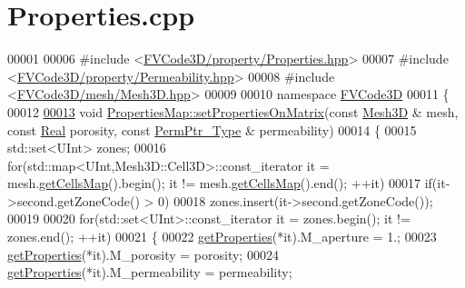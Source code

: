 \hypertarget{Properties_8cpp_source}{}\section{Properties.\+cpp}
\label{Properties_8cpp_source}

\begin{DoxyCode}
00001 
00006 \textcolor{preprocessor}{#include <\hyperlink{Properties_8hpp}{FVCode3D/property/Properties.hpp}>}
00007 \textcolor{preprocessor}{#include <\hyperlink{Permeability_8hpp}{FVCode3D/property/Permeability.hpp}>}
00008 \textcolor{preprocessor}{#include <\hyperlink{Mesh3D_8hpp}{FVCode3D/mesh/Mesh3D.hpp}>}
00009 
00010 \textcolor{keyword}{namespace }\hyperlink{namespaceFVCode3D}{FVCode3D}
00011 \{
00012 
\hypertarget{Properties_8cpp_source.tex_l00013}{}\hyperlink{classFVCode3D_1_1PropertiesMap_ad5f9cccc9355b9af66025f6c433b8997}{00013} \textcolor{keywordtype}{void} \hyperlink{classFVCode3D_1_1PropertiesMap_ad5f9cccc9355b9af66025f6c433b8997}{PropertiesMap::setPropertiesOnMatrix}(\textcolor{keyword}{const} 
      \hyperlink{classFVCode3D_1_1Mesh3D}{Mesh3D} & mesh, \textcolor{keyword}{const} \hyperlink{namespaceFVCode3D_a40c1f5588a248569d80aa5f867080e83}{Real} porosity, \textcolor{keyword}{const} \hyperlink{namespaceFVCode3D_aee5ae48a57366603109f90f526a645b1}{PermPtr\_Type} & permeability)
00014 \{
00015     std::set<UInt> zones;
00016     \textcolor{keywordflow}{for}(std::map<UInt,Mesh3D::Cell3D>::const\_iterator it = mesh.\hyperlink{classFVCode3D_1_1Mesh3D_ad904ef5e068c89951d77e9364e960bf3}{getCellsMap}().begin(); it != 
      mesh.\hyperlink{classFVCode3D_1_1Mesh3D_ad904ef5e068c89951d77e9364e960bf3}{getCellsMap}().end(); ++it)
00017         \textcolor{keywordflow}{if}(it->second.getZoneCode() > 0)
00018             zones.insert(it->second.getZoneCode());
00019 
00020     \textcolor{keywordflow}{for}(std::set<UInt>::const\_iterator it = zones.begin(); it != zones.end(); ++it)
00021     \{
00022         \hyperlink{classFVCode3D_1_1PropertiesMap_ace888d15c9a4ab13d5e217a3a565604c}{getProperties}(*it).M\_aperture = 1.;
00023         \hyperlink{classFVCode3D_1_1PropertiesMap_ace888d15c9a4ab13d5e217a3a565604c}{getProperties}(*it).M\_porosity = porosity;
00024         \hyperlink{classFVCode3D_1_1PropertiesMap_ace888d15c9a4ab13d5e217a3a565604c}{getProperties}(*it).M\_permeability = permeability;

\end{DoxyCode}
